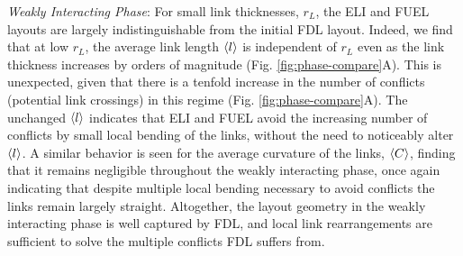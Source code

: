 \documentclass[nofootinbib,preprint,floatfix,titlepage,superscriptaddress]{revtex4} %
\begin{document}
{\em Weakly Interacting Phase}: For small link thicknesses, $r_L$, the ELI and FUEL layouts are largely indistinguishable from the initial FDL layout.
Indeed, we find that at low $r_L$, the average link length $\left<l\right>$ is independent of $r_L$ even as the link thickness increases by orders of magnitude (Fig. \ref{fig:phase-compare}A).
This is unexpected, given that there is a tenfold increase in the number of  conflicts (potential link crossings) in this regime (Fig. \ref{fig:phase-compare}A). %
The unchanged $\left<l\right>$ indicates that ELI and FUEL avoid the increasing number of conflicts by small local bending of the links, without the need to noticeably alter $\left<l\right>$.
A similar behavior is seen for the average curvature of the links, $\left<C\right>$, finding that it remains negligible throughout the weakly interacting phase, once again indicating that despite multiple local bending necessary to avoid conflicts the links remain largely straight. 
Altogether, the layout geometry in the weakly interacting phase is well captured by FDL, and local link rearrangements are sufficient to solve the multiple conflicts FDL suffers from. 
\end{document}

